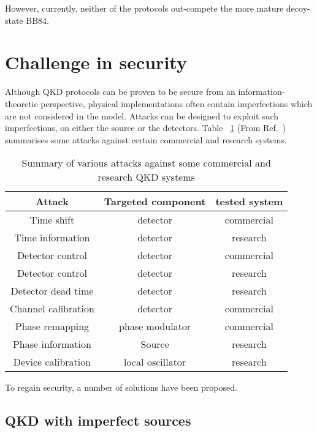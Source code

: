 However, currently, neither of the protocols out-compete the more mature decoy-state BB84.

\section{Challenge in security}
Although QKD protocols can be proven to be secure from an information-theoretic perspective, physical implementations often contain imperfections which are not considered in the model. Attacks can be designed to exploit such imperfections, on either the source or the detectors.
% 
Table ~\ref{attacks} (From Ref.~\cite{lo2014secure}) summarises some attacks against certain commercial and research systems.

\begin{table}
\begin{tabular}{ |c|c|c| } 
 \hline
 Attack &  Targeted component & tested system\\ 
  \hline
Time shift\cite{qi2005time,PhysRevA.78.042333,PhysRevA.74.022313}
        & detector & commercial \\
Time information\cite{lamas2007breaking}  & detector & research \\
Detector control \cite{lydersen2010hacking,yuan2010avoiding}  & detector  &   commercial \\
Detector control \cite{gerhardt2011full}    & detector  & research  \\
Detector dead time\cite{weier2011quantum}     & detector  & research         \\
Channel calibration\cite{jain2011device}    & detector  &  commercial        \\
Phase remapping\cite{xu2010experimental} &  phase modulator & commercial \\
Phase information\cite{tang2013source} & Source & research           \\
Device calibration\cite{jouguet2013preventing} & local oscillator & research \\
                \hline
\end{tabular}
\caption{\label{attacks} Summary of various attacks against some commercial and 
research QKD systems}
\end{table}


To regain security, a number of solutions have been proposed. 

\subsection{QKD with imperfect sources}

